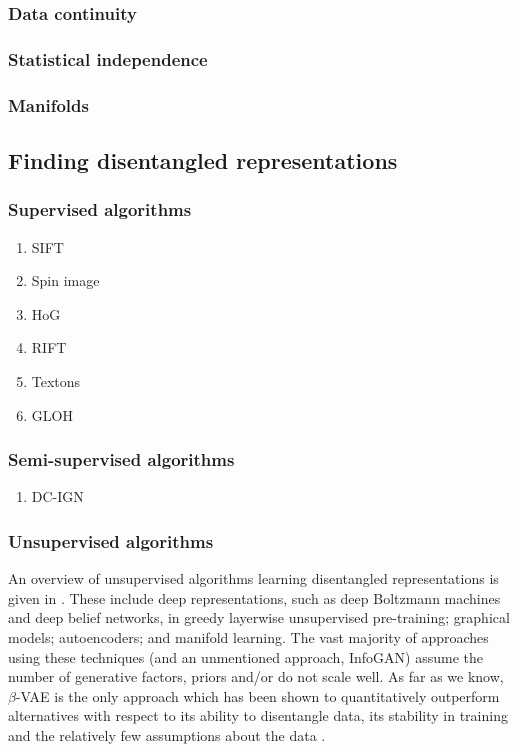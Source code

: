 \documentclass[12pt,twoside]{article}
\begin{document}
\subsubsection{Data continuity}

\subsubsection{Statistical independence}

\subsubsection{Manifolds}

\subsection{Finding disentangled representations}

\subsubsection{Supervised algorithms}

\begin{enumerate}
\item SIFT
\item Spin image
\item HoG
\item RIFT
\item Textons
\item GLOH
\end{enumerate}

\subsubsection{Semi-supervised algorithms}

\begin{enumerate}
\item DC-IGN
\end{enumerate}

\subsubsection{Unsupervised algorithms}

An overview of unsupervised algorithms learning disentangled representations is given in \cite{Bengio2013}. These include deep representations, such as deep Boltzmann machines and deep belief networks, in greedy layerwise unsupervised pre-training; graphical models; autoencoders; and manifold learning. The vast majority of approaches using these techniques (and an unmentioned approach, InfoGAN) assume the number of generative factors, priors and/or do not scale well. As far as we know, $\beta$-VAE is the only approach which has been shown to quantitatively outperform alternatives with respect to its ability to disentangle data, its stability in training and the relatively few assumptions about the data \cite{Higgins2016}.\\
\end{document}
